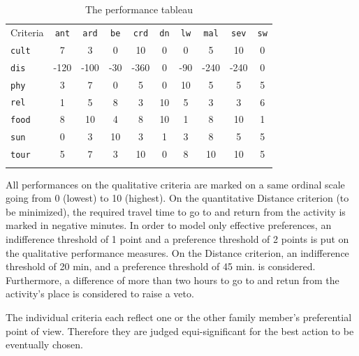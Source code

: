 \begin{table}[ht]
\caption{The performance tableau}
\label{tab:15.5}       %
\begin{center}
\begin{small}
    \begin{tabular}{l|c c c c c c c c c}
      \svhline\noalign{\smallskip}
      Criteria & \texttt{ant} & \texttt{ard} & \texttt{be} & \texttt{crd} & \texttt{dn} & \texttt{lw} & \texttt{mal} & \texttt{sev} & \texttt{sw} \\
      \noalign{\smallskip}\hline\noalign{\smallskip}
      \texttt{cult} & 7    & 3    & 0   & 10   & 0 & 0   & 5    & 10   & 0\\
      \texttt{dis}  & -120 & -100 & -30 & -360 & 0 & -90 & -240 & -240 & 0\\
      \texttt{phy}  & 3    & 7    & 0   & 5    & 0 & 10  & 5    & 5    & 5\\
      \texttt{rel}  & 1    & 5    & 8   & 3    & 10 & 5  & 3    & 3   & 6\\
      \texttt{food} & 8    & 10   & 4   & 8    & 10 & 1  & 8    & 10  & 1\\
      \texttt{sun}  & 0    & 3    & 10  & 3    & 1  & 3  & 8    & 5   & 5\\
      \texttt{tour}  & 5   & 7    & 3   & 10   & 0  & 8  & 10   & 10  & 5\\
      \noalign{\smallskip}\hline
    \end{tabular}
\end{small}
\end{center}
\end{table}

All performances on the qualitative criteria are marked on a same ordinal scale going from 0 (lowest) to 10 (highest). On the quantitative Distance criterion (to be minimized), the required travel time to go to and return from the activity is marked in negative minutes. In order to model only effective preferences, an indifference threshold of 1 point and a preference threshold of 2 points is put on the qualitative performance measures. On the Distance criterion, an indifference threshold of 20 min, and a preference threshold of 45 min. is considered. Furthermore, a difference of more than two hours to go to and retun from the activity’s place is considered to raise a veto.

The individual criteria each reflect one or the other family member’s preferential point of view. Therefore they are judged equi-significant for the best action to be eventually chosen.

